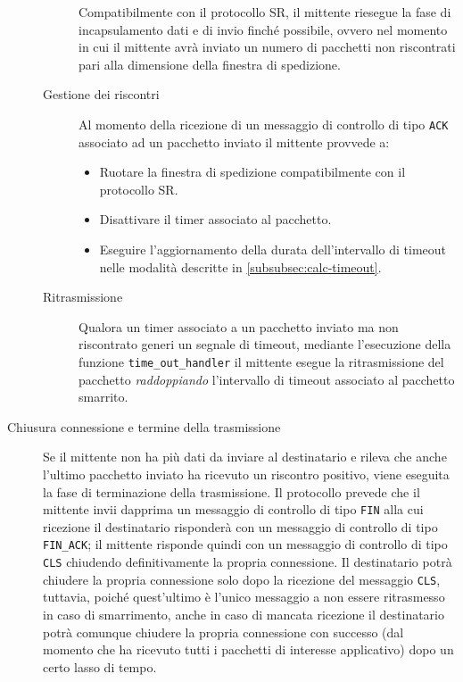 \documentclass[10pt,a4paper, titlepage]{report}
\begin{document}
\begin{description}
\begin{description}
Compatibilmente con il protocollo SR, il mittente riesegue la fase di incapsulamento dati e di invio finché possibile, ovvero nel momento in cui il mittente avrà inviato un numero di pacchetti non riscontrati pari alla dimensione della finestra di spedizione. 

\item[Gestione dei riscontri] Al momento della ricezione di un messaggio di controllo di tipo \texttt{ACK} associato ad un pacchetto inviato il mittente provvede a:
\begin{itemize}
\item Ruotare la finestra di spedizione compatibilmente con il protocollo SR.
\item Disattivare il timer associato al pacchetto.
\item Eseguire l'aggiornamento della durata dell'intervallo di timeout nelle modalità descritte in \ref{subsubsec:calc-timeout}. 
\end{itemize}

\item[Ritrasmissione] Qualora un timer associato a un pacchetto inviato ma non riscontrato generi un segnale di timeout,  mediante l'esecuzione della funzione \texttt{time\_out\_handler} il mittente esegue la ritrasmissione del pacchetto \textit{raddoppiando} l'intervallo di timeout associato al pacchetto smarrito.

\end{description}

\item[Chiusura connessione e termine della trasmissione] Se il mittente non ha più dati da inviare al destinatario e rileva che anche l'ultimo pacchetto inviato ha ricevuto un riscontro positivo, viene eseguita la fase di terminazione della trasmissione. Il protocollo prevede che il mittente invii dapprima un messaggio di controllo di tipo \texttt{FIN} alla cui ricezione il destinatario risponderà con un messaggio di controllo di tipo \texttt{FIN\_ACK}; il mittente risponde quindi con un messaggio di controllo di tipo \texttt{CLS} chiudendo definitivamente la propria connessione. Il destinatario potrà chiudere la propria connessione solo dopo la ricezione del messaggio \texttt{CLS}, tuttavia, poiché quest'ultimo è l'unico messaggio a non essere ritrasmesso in caso di smarrimento, anche in caso di mancata ricezione il destinatario potrà comunque chiudere la propria connessione con successo (dal momento che ha ricevuto tutti i pacchetti di interesse applicativo) dopo un certo lasso di tempo.

\end{description}
\end{document}
